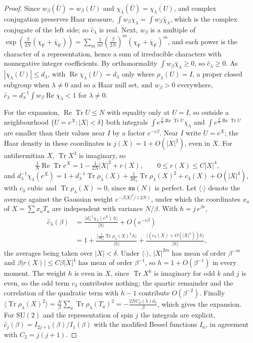 \documentclass[11pt]{amsart}
\theoremstyle{definition}
\theoremstyle{remark}
\numberwithin{equation}{section}
\newcommand{\SU}{\mathrm{SU}}
\newcommand{\Tr}{\operatorname{Tr}}
\newcommand{\ReTr}{\operatorname{Re}\operatorname{Tr}}
\begin{document}
\begin{proof}
Since $w_\beta(\bar U)=w_\beta(U)$ and $\chi_\lambda(\bar U)=
\overline{\chi_\lambda(U)}$, and complex conjugation preserves Haar measure,
$\int w_\beta\chi_\lambda=\int w_\beta\bar\chi_\lambda$, which is the
complex conjugate of the left side; so $\hat c_\lambda$ is real. Next,
$w_\beta$ is a multiple of
$\exp(\frac\beta{2N}(\chi_{\mathrm F}+\bar\chi_{\mathrm F}))=
\sum_{m}\frac1{m!}(\frac\beta{2N})^m(\chi_{\mathrm F}+\bar\chi_{\mathrm
F})^m$, and each power is the character of a representation, hence a sum
of irreducible characters with nonnegative integer coefficients. By
orthonormality $\int w_\beta\bar\chi_\lambda\ge0$, so $\hat
c_\lambda\ge0$. As $|\chi_\lambda(U)|\le d_\lambda$, with
$\operatorname{Re}\chi_\lambda(U)=d_\lambda$ only where
$\rho_\lambda(U)=I$, a proper closed subgroup when $\lambda\ne0$ and so a
Haar null set, and $w_\beta>0$ everywhere, $\hat c_\lambda=d_\lambda^{-1}
\int w_\beta\operatorname{Re}\chi_\lambda<1$ for $\lambda\ne0$.

For the expansion, $\ReTr U\le N$ with equality only at $U=I$, so outside a
neighbourhood $\{U=e^X:|X|<\delta\}$ both integrals $\int e^{\frac\beta
N\ReTr U}\chi_\lambda$ and $\int e^{\frac\beta N\ReTr U}$ are smaller than
their values near $I$ by a factor $e^{-c\beta}$. Near $I$ write $U=e^X$;
the Haar density in these coordinates is $j(X)=1+O(|X|^2)$, even in $X$.
For antihermitian $X$, $\Tr X^3$ is imaginary, so
\[
\tfrac1N\ReTr e^X=1-\tfrac1{2N}|X|^2+r(X),\qquad 0\le r(X)\le C|X|^4,
\]
and $d_\lambda^{-1}\chi_\lambda(e^X)=1+d_\lambda^{-1}\Tr\rho_\lambda(X)+
\frac1{2d_\lambda}\Tr\rho_\lambda(X)^2+c_3(X)+O(|X|^4)$, with $c_3$ cubic and
$\Tr\rho_\lambda(X)=0$, since $\mathfrak{su}(N)$ is perfect. Let
$\langle\cdot\rangle$ denote the average against the Gaussian weight
$e^{-\beta|X|^2/(2N)}$, under which the coordinates $x_a$ of $X=\sum
x_aT_a$ are independent with variance $N/\beta$. With $h=j\,e^{\beta r}$,
\[
\begin{split}
\hat c_\lambda(\beta)&=\frac{\langle d_\lambda^{-1}\chi_\lambda(e^X)\,
h\rangle}{\langle h\rangle}+O(e^{-c\beta})\\
&=1+\frac{\langle\frac1{2d_\lambda}\Tr\rho_\lambda(X)^2\,h\rangle}
{\langle h\rangle}+\frac{\langle(c_3(X)+O(|X|^4))h\rangle}{\langle h\rangle},
\end{split}
\]
the averages being taken over $|X|<\delta$. Under $\langle\cdot\rangle$,
$|X|^{2m}$ has mean of order $\beta^{-m}$ and $\beta|r(X)|\le C\beta|X|^4$
has mean of order $\beta^{-1}$, so $h=1+O(\beta^{-1})$ in every moment. The
weight $h$ is even in $X$, since $\Tr X^k$ is imaginary for odd $k$ and $j$
is even, so the odd term $c_3$ contributes nothing; the quartic remainder and
the correlation of the quadratic term with $h-1$ contribute $O(\beta^{-2})$. Finally $\langle\Tr\rho_\lambda(X)^2\rangle=
\frac N\beta\sum_a\Tr\rho_\lambda(T_a)^2=-\frac{2NC_2(\lambda)d_\lambda}
\beta$, which gives the expansion. For $\SU(2)$ and the representation of
spin $j$ the integrals are explicit, $\hat c_j(\beta)=I_{2j+1}(\beta)/
I_1(\beta)$ with the modified Bessel functions $I_n$, in agreement with
$C_2=j(j+1)$.
\end{proof}
\end{document}
